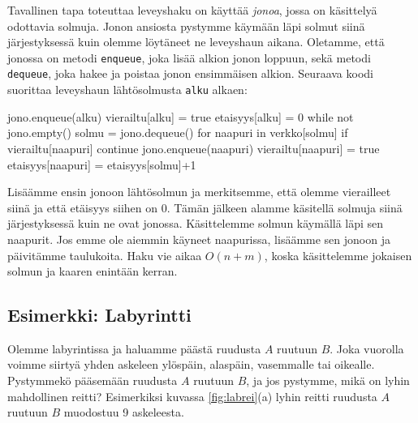 Tavallinen tapa toteuttaa leveyshaku on käyttää \emph{jonoa},
jossa on käsittelyä odottavia solmuja.
Jonon ansiosta pystymme käymään läpi solmut siinä
jär\-jestyksessä kuin olemme löytäneet ne leveyshaun aikana.
Oletamme, että jonossa on metodi \texttt{enqueue},
joka lisää alkion jonon loppuun, sekä metodi \texttt{dequeue},
joka hakee ja poistaa jonon ensimmäisen alkion.
Seuraava koodi suorittaa leveyshaun lähtösolmusta \texttt{alku} alkaen:

\begin{code}
jono.enqueue(alku)
vierailtu[alku] = true
etaisyys[alku] = 0
while not jono.empty()
    solmu = jono.dequeue()
    for naapuri in verkko[solmu]
        if vierailtu[naapuri]
            continue
        jono.enqueue(naapuri)
        vierailtu[naapuri] = true
        etaisyys[naapuri] = etaisyys[solmu]+1
\end{code}

Lisäämme ensin jonoon lähtösolmun ja merkitsemme,
että olemme vierailleet siinä ja että etäisyys siihen on $0$.
Tämän jälkeen alamme käsitellä solmuja siinä järjestyksessä kuin ne ovat jonossa.
Käsittelemme solmun käymällä läpi sen naapurit.
Jos emme ole aiemmin käyneet naapurissa, lisäämme sen jonoon
ja päivitämme taulukoita.
Haku vie aikaa $O(n+m)$, koska käsittelemme jokaisen
solmun ja kaaren enintään kerran.

\subsection{Esimerkki: Labyrintti}

Olemme labyrintissa ja haluamme päästä ruudusta $A$ ruutuun $B$.
Joka vuorolla voimme siirtyä yhden askeleen ylöspäin, alaspäin,
vasemmalle tai oikealle.
Pystymmekö pääsemään ruudusta $A$ ruutuun $B$, ja jos pystymme,
mikä on lyhin mahdollinen reitti?
Esimerkiksi kuvassa \ref{fig:labrei}(a) lyhin reitti
ruudusta $A$ ruutuun $B$ muodostuu 9 askeleesta.

